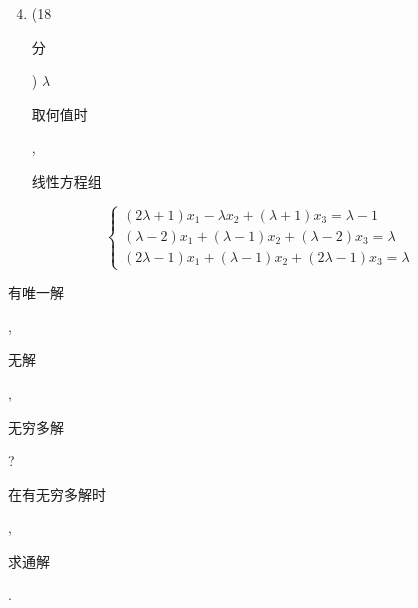 \documentclass[10pt]{article}
\begin{document}
\begin{enumerate}
  \setcounter{enumi}{3}
  \item (18 \begin{CJK}{UTF8}{mj}分\end{CJK}) $\lambda$ \begin{CJK}{UTF8}{mj}取何值时\end{CJK}, \begin{CJK}{UTF8}{mj}线性方程组\end{CJK}
\end{enumerate}
$$
\left\{\begin{array}{l}
(2 \lambda+1) x_{1}-\lambda x_{2}+(\lambda+1) x_{3}=\lambda-1 \\
(\lambda-2) x_{1}+(\lambda-1) x_{2}+(\lambda-2) x_{3}=\lambda \\
(2 \lambda-1) x_{1}+(\lambda-1) x_{2}+(2 \lambda-1) x_{3}=\lambda
\end{array}\right.
$$
\begin{CJK}{UTF8}{mj}有唯一解\end{CJK}, \begin{CJK}{UTF8}{mj}无解\end{CJK}, \begin{CJK}{UTF8}{mj}无穷多解\end{CJK}? \begin{CJK}{UTF8}{mj}在有无穷多解时\end{CJK}, \begin{CJK}{UTF8}{mj}求通解\end{CJK}.
\end{document}
